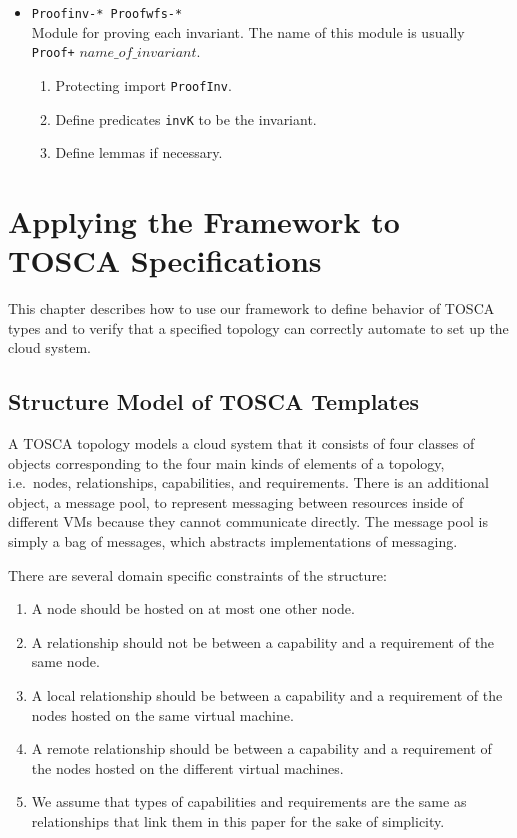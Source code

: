 \documentclass[12pt]{report}
\begin{document}
\begin{itemize}
\begin{enumerate}
  \end{enumerate}
\item {\tt Proofinv-*  Proofwfs-*}\\
  Module for proving each invariant. The name of this module is usually
  {\tt Proof+} $name\_of\_invariant$.
  \begin{enumerate}
  \item Protecting import {\tt ProofInv}.
  \item Define predicates {\tt invK} to be the invariant.
  \item Define lemmas if necessary.
  \end{enumerate}
\end{itemize}

\chapter{Applying the Framework to TOSCA Specifications}
\label{chap:appTOSCA}
This chapter describes how to use our framework to define behavior of
TOSCA types and to verify that a specified topology can correctly
automate to set up the cloud system.

\section{Structure Model of TOSCA Templates}
\label{sec:TOSCAstructure}
A TOSCA topology models a cloud system that it consists of
four classes of objects corresponding to the four main kinds of
elements of a topology, i.e.\ nodes, relationships, capabilities, and
requirements. There is an additional object, a message pool, to
represent messaging between resources inside of different VMs because
they cannot communicate directly. The message pool is simply a bag of
messages, which abstracts implementations of messaging.

There are several domain specific constraints of the structure:
\begin{enumerate}
\item A node should be hosted on at most one other node.
\item A relationship should not be between a capability and a
  requirement of the same node.
\item A local relationship should be between a capability and a
  requirement of the nodes hosted on the same virtual machine.
\item A remote relationship should be between a capability and a
  requirement of the nodes hosted on the different virtual machines.
\item We assume that types of capabilities and requirements are
  the same as relationships that link them in this paper for the sake
  of simplicity.
\end{enumerate}
\end{document}
